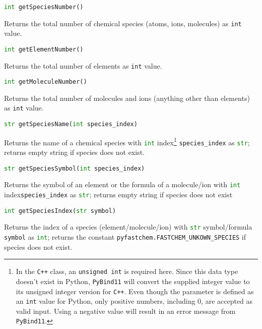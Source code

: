\documentclass[numbers=noenddot]{aux/fcmanual}
\newcommand{\cpp}{\ttt{C++}\xspace}
\newcommand{\pb}{\texttt{PyBind11}\xspace}
\newcommand{\ttt}[1]{\texttt {#1}}
\begin{document}
\bigbreak

\lstinline[language=Python]!int getSpeciesNumber()!
\begin{addmargin}[25pt]{0pt}
	Returns the total number of chemical species (atoms, ions, molecules) as \lstinline!int! value.
\end{addmargin}

\bigbreak

\lstinline[language=Python]!int getElementNumber()!
\begin{addmargin}[25pt]{0pt}
	Returns the total number of elements as \lstinline!int! value.
\end{addmargin}

\bigbreak

\lstinline[language=Python]!int getMoleculeNumber()!
\begin{addmargin}[25pt]{0pt}
	Returns the total number of molecules and ions (anything other than elements) as \lstinline!int! value.
\end{addmargin}

\bigbreak

\lstinline[language=Python]!str getSpeciesName(int species_index)!
\begin{addmargin}[25pt]{0pt}
	Returns the name of a chemical species with \lstinline[language=Python]!int! index\footnote{In the \cpp class, an \lstinline!unsigned int! is required here. Since this data type doesn't exist in Python, \pb will convert the supplied integer value to its unsigned integer version for \cpp. Even though the parameter is defined as an \lstinline!int! value for Python, only positive numbers, including 0, are accepted as valid input. Using a negative value will result in an error message from \pb.} \lstinline!species_index! as \lstinline[language=Python]!str!; returns empty string if species does not exist.
\end{addmargin}  

\bigbreak

\lstinline[language=Python]!str getSpeciesSymbol(int species_index)!
\begin{addmargin}[25pt]{0pt}
	Returns the symbol of an element or the formula of a molecule/ion with \lstinline[language=Python]!int! index\footnotemark[\value{footnote}] \lstinline!species_index! as \lstinline[language=Python]!str!; returns empty string if species does not exist
\end{addmargin}

\bigbreak

\lstinline[language=Python]!int getSpeciesIndex(str symbol)!
\begin{addmargin}[25pt]{0pt}
	Returns the index of a species (element/molecule/ion) with \lstinline[language=Python]!str! symbol/formula \lstinline!symbol! as \lstinline[language=Python]!int!; returns the constant \lstinline!pyfastchem.FASTCHEM_UNKOWN_SPECIES! if species does not exist.
\end{addmargin}
\end{document}
